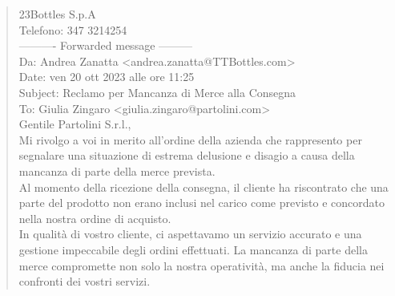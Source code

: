 \begin{tcolorbox}[colback=gray!20, colframe=gray!50,sharp corners=southwest]
\begin{quote}
23Bottles S.p.A\vspace{14pt}\\
Telefono: 347 3214254\vspace{14pt}\\
---------- Forwarded message ---------\\
Da: Andrea Zanatta <andrea.zanatta@TTBottles.com>\\
Date: ven 20 ott 2023 alle ore 11:25\\
Subject: Reclamo per Mancanza di Merce alla Consegna\\
To: Giulia Zingaro <giulia.zingaro@partolini.com>\vspace{14pt}\\
Gentile Partolini S.r.l.,\vspace{14pt}\\
Mi rivolgo a voi in merito all'ordine della azienda che rappresento per
segnalare una situazione di estrema delusione e disagio a causa della
mancanza di parte della merce prevista.\vspace{14pt}\\
Al momento della ricezione della consegna, il cliente ha riscontrato che
una parte del prodotto non erano inclusi nel carico come previsto e
concordato nella nostra ordine di acquisto.\vspace{14pt}\\
In qualità di vostro cliente, ci aspettavamo un servizio accurato e una
gestione impeccabile degli ordini effettuati. La mancanza di parte della
merce compromette non solo la nostra operatività, ma anche la fiducia nei
confronti dei vostri servizi.\vspace{14pt}\\
\end{quote}
\end{tcolorbox}
